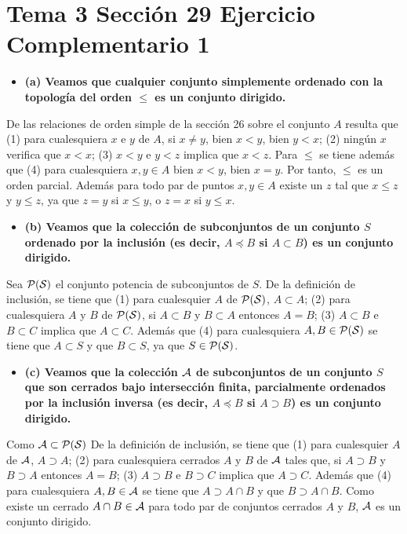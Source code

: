 \documentclass{article}
\begin{document}
\section{Tema 3 Sección 29 Ejercicio Complementario 1}
\begin{itemize}
\item \bf (a) \rm Veamos que cualquier conjunto simplemente ordenado con la topología del orden $\leq$ es un conjunto dirigido.
\end{itemize}
De las relaciones de orden simple de la sección 26 sobre el conjunto $A$ resulta que
(1) para cualesquiera $x$ e $y$ de $A$, si $x\neq y$, bien $x<y$, bien $y<x$;
(2) ningún $x$ verifica que $x<x$;
(3) $x<y$ e $y<z$ implica que $x<z$. Para $\leq$ se tiene además que (4) para cualesquiera $x,y\in A$ bien $x<y$, bien $x=y$. Por tanto, $\leq $ es un orden parcial. Además para todo par de puntos $x,y\in A$ existe un $z$ tal que $x\leq z$ y $y\leq z$, ya que $z=y$ si $x\leq y$, o $z=x$ si $y\leq x$.
\begin{itemize}
\item \bf (b) \rm Veamos que la colección de subconjuntos de un conjunto $S$ ordenado por la inclusión (es decir, $A\preceq B$ si $A\subset B$) es un conjunto dirigido.
\end{itemize}
Sea $\cal{P}(S)$ el conjunto potencia de subconjuntos de $S$. De la definición de inclusión, se tiene que  
(1) para cualesquier $A$ de $\cal{P}(S)$, $A\subset A$;
(2) para cualesquiera $A$ y $B$ de $\cal{P}(S)$, si $A\subset B$ y $B\subset A$ entonces $A=B$;
(3) $A\subset B$ e $B\subset C$ implica que $A\subset C$. Además que (4) para cualesquiera $A,B\in \cal{P}(S)$ se tiene que  $A\subset S$ y que $B\subset S$, ya que $S\in\cal{P}(S)$.
\begin{itemize}
\item \bf (c) \rm Veamos que la colección $\cal{A}$ de subconjuntos de un conjunto $S$ que son cerrados bajo intersección finita, parcialmente ordenados por la inclusión inversa (es decir, $A\preceq B$ si $A\supset B$) es un conjunto dirigido.
\end{itemize}
Como $\cal{A}\subset \cal{P}(S)$ De la definición de inclusión, se tiene que  
(1) para cualesquier $A$ de $\cal{A}$, $A\supset A$;
(2) para cualesquiera cerrados $A$ y $B$ de $\cal{A}$ tales que, si $A\supset B$ y $B\supset A$ entonces $A=B$;
(3) $A\supset B$ e $B\supset C$ implica que $A\supset C$. Además que (4) para cualesquiera $A,B\in \cal{A}$ se tiene que  $A\supset A\cap B$ y que $B\supset A\cap B$. Como existe un cerrado $A\cap B\in\cal{A}$ para todo par de conjuntos cerrados $A$ y $B$, $\cal{A}$ es un conjunto dirigido.
\end{document}
